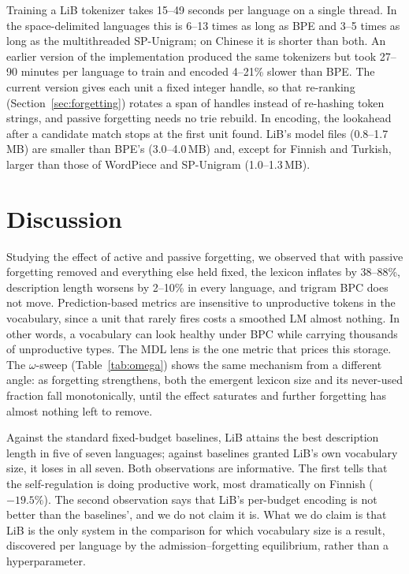 \documentclass[pdflatex,sn-apa]{sn-jnl}
\begin{document}
Training a LiB tokenizer takes 15--49 seconds per language on a single
thread.
In the space-delimited languages this is 6--13 times as long as BPE and
3--5 times as long as the multithreaded SP-Unigram; on Chinese it is
shorter than both.
An earlier version of the implementation produced the same tokenizers but
took 27--90 minutes per language to train and encoded 4--21\% slower than
BPE.
The current version gives each unit a fixed integer handle, so that
re-ranking (Section~\ref{sec:forgetting}) rotates a span of handles instead
of re-hashing token strings, and passive forgetting needs no trie rebuild.
In encoding, the lookahead after a candidate match stops at the first unit
found.
LiB's model files (0.8--1.7\,MB) are smaller than BPE's (3.0--4.0\,MB) and,
except for Finnish and Turkish, larger than those of WordPiece and
SP-Unigram (1.0--1.3\,MB).


\section{Discussion}
\label{sec:discussion}

Studying the effect of active and passive forgetting, we observed that with passive forgetting removed
and everything else held fixed, the lexicon inflates by 38--88\%, description
length worsens by 2--10\% in every language, and trigram BPC does not move.
Prediction-based metrics are insensitive to unproductive tokens in the vocabulary, since a unit that
rarely fires costs a smoothed LM almost nothing. In other words, a vocabulary can look
healthy
under BPC while carrying thousands of unproductive types.
The MDL lens is the one metric that prices this storage.
The $\omega$-sweep (Table~\ref{tab:omega}) shows the same mechanism from a
different angle: as forgetting strengthens, both the emergent lexicon size and
its never-used fraction fall monotonically, until the effect saturates and
further forgetting has almost nothing left to remove.

Against the standard fixed-budget baselines, LiB attains the best description
length in five of seven languages; against baselines granted LiB's own
vocabulary size, it loses in all seven.
Both observations are informative.
The first tells that the self-regulation is doing productive work,
most dramatically on Finnish
($-19.5\%$).
The second observation says that LiB's per-budget encoding is not better than the baselines',
and we do not claim it is.
What we do claim is that LiB is the only system in the
comparison for which vocabulary size is a result, discovered per
language by the admission--forgetting equilibrium, rather than a
hyperparameter.
\end{document}
